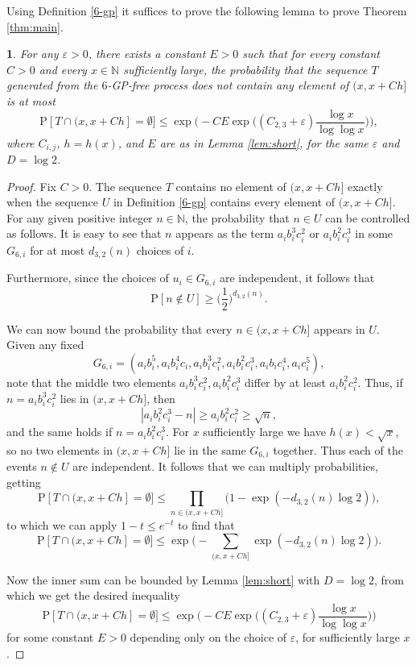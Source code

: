 \documentclass[12pt,english,BCOR7.5mm]{amsart}
\numberwithin{equation}{section}
\numberwithin{figure}{section}
\theoremstyle{definition}
\theoremstyle{plain}
\theoremstyle{plain}
\newtheorem{lem}[thm]{\protect\lemmaname}
\theoremstyle{plain}
\theoremstyle{definition}
\theoremstyle{plain}
\theoremstyle{plain}
\providecommand{\lemmaname}{Lemma}
\begin{document}
Using Definition \ref{6-gp} it suffices to prove the following lemma
to prove Theorem \ref{thm:main}.
\begin{lem}
\label{lem:main}For any $\varepsilon>0$, there exists a constant
$E>0$ such that for every constant $C>0$ and every $x\in\mathbb{N}$
sufficiently large, the probability that the sequence $T$ generated
from the $6$-GP-free process does not contain any element of $(x,x+Ch]$
is at most\textup{
\[
\mbox{P}[T\cap(x,x+Ch]=\emptyset]\leq\exp\Big(-CE\exp\Big((C_{2,3}+\varepsilon)\frac{\log x}{\log\log x}\Big)\Big),
\]
}\textup{\emph{where $C_{i,j}$, $h=h(x)$, and $E$ are as in Lemma
\ref{lem:short}, for the same $\varepsilon$ and $D=\log2$.}}\end{lem}
\begin{proof}
Fix $C>0$. The sequence $T$ contains no element of $(x,x+Ch]$ exactly
when the sequence $U$ in Definition \ref{6-gp} contains every element
of $(x,x+Ch]$. For any given positive integer $n\in\mathbb{N}$,
the probability that $n\in U$ can be controlled as follows. It is
easy to see that $n$ appears as the term $a_{i}b_{i}^{3}c_{i}^{2}$
or $a_{i}b_{i}^{2}c_{i}^{3}$ in some $G_{6,i}$ for at most $d_{3,2}(n)$
choices of $i$.

Furthermore, since the choices of $u_{i}\in G_{6,i}$ are independent,
it follows that
\[
\mbox{P}[n\not\in U]\geq\Big(\frac{1}{2}\Big)^{d_{3,2}(n)}.
\]

We can now bound the probability that every $ $$n\in(x,x+Ch]$ appears
in $U$. Given any fixed 
\[
G_{6,i}=(a_{i}b_{i}^{5},a_{i}b_{i}^{4}c_{i},a_{i}b_{i}^{3}c_{i}^{2},a_{i}b_{i}^{2}c_{i}^{3},a_{i}b_{i}c_{i}^{4},a_{i}c_{i}^{5}),
\]
note that the middle two elements $a_{i}b_{i}^{3}c_{i}^{2},a_{i}b_{i}^{2}c_{i}^{3}$
differ by at least $a_{i}b_{i}^{2}c_{i}^{2}$. Thus, if $n=a_{i}b_{i}^{3}c_{i}^{2}$
lies in $(x,x+Ch]$, then 
\[
|a_{i}b_{i}^{2}c_{i}^{3}-n|\geq a_{i}b_{i}^{2}c_{i}^{2}\geq\sqrt{n},
\]
and the same holds if $n=a_{i}b_{i}^{2}c_{i}^{3}$. For $x$ sufficiently
large we have $h(x)<\sqrt{x}$, so no two elements in $(x,x+Ch]$
lie in the same $G_{6,i}$ together. Thus each of the events $n\not\in U$
are independent. It follows that we can multiply probabilities, getting
\[
\mbox{P}[T\cap(x,x+Ch]=\emptyset]\leq\prod_{n\in(x,x+Ch]}\Big(1-\exp(-d_{3,2}(n)\log2)\Big),
\]
to which we can apply $1-t\leq e^{-t}$ to find that
\[
\mbox{P}[T\cap(x,x+Ch]=\emptyset]\leq\exp\Big(-\sum_{(x,x+Ch]}\exp(-d_{3,2}(n)\log2)\Big).
\]

Now the inner sum can be bounded by Lemma \ref{lem:short} with $D=\log2$,
from which we get the desired inequality
\[
\mbox{P}[T\cap(x,x+Ch]=\emptyset]\leq\exp\Big(-CE\exp\Big((C_{2,3}+\varepsilon)\frac{\log x}{\log\log x}\Big)\Big)
\]
for some constant $E>0$ depending only on the choice of $\varepsilon$,
for sufficiently large $x$.
\end{proof}
\end{document}
